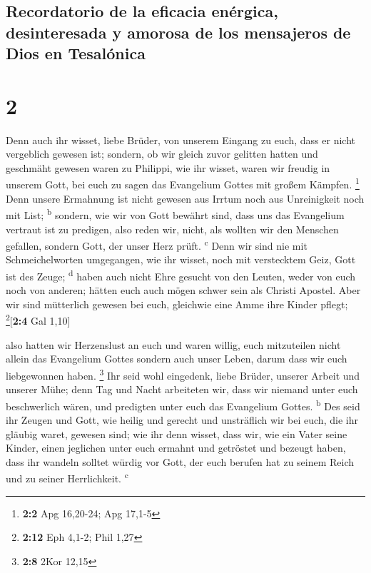 \hypertarget{recordatorio-de-la-eficacia-enuxe9rgica-desinteresada-y-amorosa-de-los-mensajeros-de-dios-en-tesaluxf3nica}{%
\subsection{Recordatorio de la eficacia enérgica, desinteresada y
amorosa de los mensajeros de Dios en
Tesalónica}\label{recordatorio-de-la-eficacia-enuxe9rgica-desinteresada-y-amorosa-de-los-mensajeros-de-dios-en-tesaluxf3nica}}

\hypertarget{section-1}{%
\section{2}\label{section-1}}

 Denn auch ihr wisset, liebe Brüder, von unserem Eingang
zu euch, dass er nicht vergeblich gewesen ist;  sondern,
ob wir gleich zuvor gelitten hatten und geschmäht gewesen waren zu
Philippi, wie ihr wisset, waren wir freudig in unserem Gott, bei euch zu
sagen das Evangelium Gottes mit großem Kämpfen. \footnote{\textbf{2:2}
  Apg 16,20-24; Apg 17,1-5}  Denn unsere Ermahnung ist
nicht gewesen aus Irrtum noch aus Unreinigkeit noch mit List;
\textsuperscript{b}  sondern, wie wir von Gott bewährt
sind, dass uns das Evangelium vertraut ist zu predigen, also reden wir,
nicht, als wollten wir den Menschen gefallen, sondern Gott, der unser
Herz prüft. \textsuperscript{c}  Denn wir sind nie mit
Schmeichelworten umgegangen, wie ihr wisset, noch mit verstecktem Geiz,
Gott ist des Zeuge; \textsuperscript{d}  haben auch nicht
Ehre gesucht von den Leuten, weder von euch noch von anderen;
 hätten euch auch mögen schwer sein als Christi Apostel.
Aber wir sind mütterlich gewesen bei euch, gleichwie eine Amme ihre
Kinder pflegt; \footnote{\textbf{2:12} Eph 4,1-2; Phil 1,27}{[}\textbf{2:4}
Gal 1,10{]}

 also hatten wir Herzenslust an euch und waren willig,
euch mitzuteilen nicht allein das Evangelium Gottes sondern auch unser
Leben, darum dass wir euch liebgewonnen haben. \footnote{\textbf{2:8}
  2Kor 12,15}  Ihr seid wohl eingedenk, liebe Brüder,
unserer Arbeit und unserer Mühe; denn Tag und Nacht arbeiteten wir, dass
wir niemand unter euch beschwerlich wären, und predigten unter euch das
Evangelium Gottes. \textsuperscript{b}  Des seid ihr
Zeugen und Gott, wie heilig und gerecht und unsträflich wir bei euch,
die ihr gläubig waret, gewesen sind;  wie ihr denn
wisset, dass wir, wie ein Vater seine Kinder, einen jeglichen unter euch
ermahnt und getröstet  und bezeugt haben, dass ihr
wandeln solltet würdig vor Gott, der euch berufen hat zu seinem Reich
und zu seiner Herrlichkeit. \textsuperscript{c}

